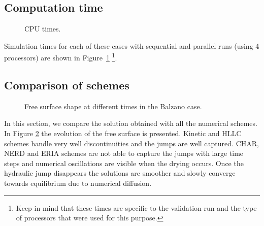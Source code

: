 \subsection{Computation time}

\begin{figure}[H]
  \centering
  \caption{CPU times.}\label{fig:balzano:cputime}
\end{figure}

Simulation times for each of these cases with sequential and parallel runs
(using 4 processors) are shown in Figure~\ref{fig:balzano:cputime}
\footnote{Keep in mind that these times
are specific to the validation run and the type of processors that were used for this purpose.}.

\subsection{Comparison of schemes}

\begin{figure}[H]
\begin{minipage}[t]{0.5\textwidth}
 \centering
\end{minipage}%
\begin{minipage}[t]{0.5\textwidth}
 \centering
\end{minipage}
\begin{minipage}[t]{0.5\textwidth}
 \centering
\end{minipage}%
\begin{minipage}[t]{0.5\textwidth}
 \centering
\end{minipage}
\begin{minipage}[t]{0.5\textwidth}
 \centering
\end{minipage}%
\begin{minipage}[t]{0.5\textwidth}
 \centering
\end{minipage}
\caption{Free surface shape at different times in the Balzano case.}
\label{fig:balzano:SL}
\end{figure}

In this section, we compare the solution obtained with all the numerical schemes.
In Figure \ref{fig:balzano:SL} the evolution of the free surface is presented.
Kinetic and HLLC schemes handle very well discontinuities and the jumps are well
captured.
CHAR, NERD and ERIA schemes are not able to capture the jumps with large time
steps and numerical oscillations are visible when the drying occurs.
Once the hydraulic jump disappears the solutions are smoother and slowly
converge towards equilibrium due to numerical diffusion.

